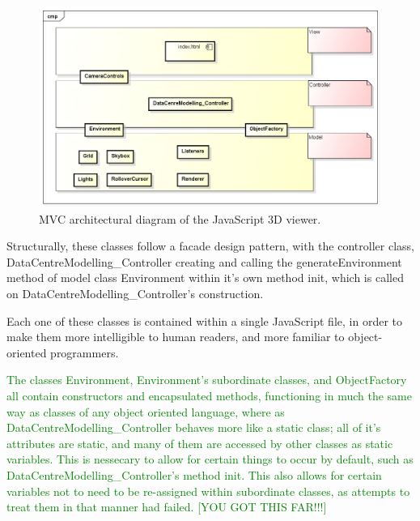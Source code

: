 \begin{figure}[H]
\centering
\includegraphics[width=5in]{Resources//Design_Diagrams//Component_JavaScript 3D model.png}
\caption{MVC architectural diagram of the JavaScript 3D viewer.}
\label{fig:JavaScriptArchitectureDiagram}
\end{figure}

Structurally, these classes follow a facade design pattern, with the controller class, DataCentreModelling\_Controller creating and calling the generateEnvironment method of model class Environment within it's own  method init, which is called on DataCentreModelling\_Controller's construction. 

Each one of these classes is contained within a single JavaScript file, in order to make them more intelligible to human readers, and more familiar to object-oriented programmers.

\textcolor{green}{
The classes Environment, Environment's subordinate classes, and ObjectFactory all contain constructors and encapsulated methods, functioning in much the same way as classes of any object oriented language, where as DataCentreModelling\_Controller behaves more like a static class; all of it's attributes are static, and many of them are accessed by other classes as static variables. This is nessecary to allow for certain things to occur by default, such as DataCentreModelling\_Controller's method init. This also allows for certain variables not to need to be re-assigned within subordinate classes, as attempts to treat them in that manner had failed.
[YOU GOT THIS FAR!!!]}

